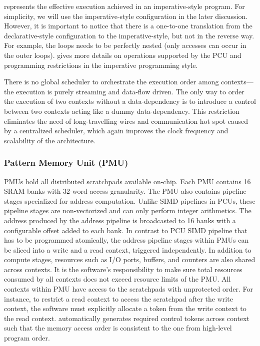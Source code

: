  represents the effective execution achieved in an imperative-style program.
For simplicity, we will use the imperative-style configuration in the later discussion.
However, it is important to notice that there is a one-to-one translation from the 
declarative-style configuration to the imperative-style, but not in the reverse way.
For example, the loops needs to be perfectly nested (only accesses can occur in the outer
loops).
 gives more details on operations supported by the PCU and programming
restrictions in the imperative programming style.

There is no global scheduler to orchestrate the execution order among contexts---the execution is purely
streaming and data-flow driven. 
The only way to order the execution of two contexts without a data-dependency is to 
introduce a control  between two contexts acting like a dummy data-dependency.
This restriction eliminates the need of long-travelling wires and communication hot spot caused by a
centralized scheduler, which  again improves the clock frequency and scalability of the architecture.

\subsubsection{Pattern Memory Unit (PMU)}
PMUs hold all distributed scratchpads available on-chip. 
Each PMU contains 16 SRAM banks with
32-word access granularity. The PMU also contains pipeline stages specialized for address
computation. Unlike SIMD pipelines in PCUs, these pipeline stages are non-vectorized and can only 
perform integer arithmetics. 
The address produced by the address pipeline is broadcasted to 16 banks with a configurable offset added to each bank.
In contrast to PCU SIMD pipeline that has to be programmed atomically, the address pipeline stages 
within PMUs can be sliced into a write and a read context, triggered independently.
In addition to compute stages, resources such as I/O ports, buffers, and counters are also shared across contexts.
It is the software's responsibility to make sure total resources consumed by all
contexts does not exceed resource limits of the PMU.
All contexts within PMU have access to the scratchpads with unprotected order. For instance, to
restrict a read context to access the scratchpad after the write context, the software must explicitly allocate
a token from the write context to the read context.
\name automatically generates required control tokens across context such that the memory access order is
consistent to the one from high-level program order.

